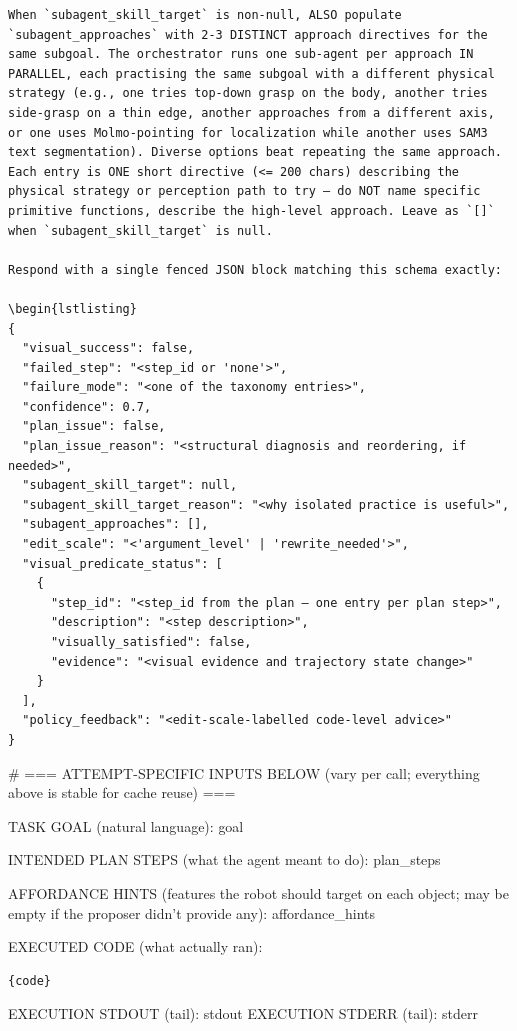 \documentclass{llmxive}
\begin{document}
\begin{lstlisting}[style=ratsappendixprompt]
When `subagent_skill_target` is non-null, ALSO populate
`subagent_approaches` with 2-3 DISTINCT approach directives for the
same subgoal. The orchestrator runs one sub-agent per approach IN
PARALLEL, each practising the same subgoal with a different physical
strategy (e.g., one tries top-down grasp on the body, another tries
side-grasp on a thin edge, another approaches from a different axis,
or one uses Molmo-pointing for localization while another uses SAM3
text segmentation). Diverse options beat repeating the same approach.
Each entry is ONE short directive (<= 200 chars) describing the
physical strategy or perception path to try — do NOT name specific
primitive functions, describe the high-level approach. Leave as `[]`
when `subagent_skill_target` is null.

Respond with a single fenced JSON block matching this schema exactly:

\begin{lstlisting}
{
  "visual_success": false,
  "failed_step": "<step_id or 'none'>",
  "failure_mode": "<one of the taxonomy entries>",
  "confidence": 0.7,
  "plan_issue": false,
  "plan_issue_reason": "<structural diagnosis and reordering, if needed>",
  "subagent_skill_target": null,
  "subagent_skill_target_reason": "<why isolated practice is useful>",
  "subagent_approaches": [],
  "edit_scale": "<'argument_level' | 'rewrite_needed'>",
  "visual_predicate_status": [
    {
      "step_id": "<step_id from the plan — one entry per plan step>",
      "description": "<step description>",
      "visually_satisfied": false,
      "evidence": "<visual evidence and trajectory state change>"
    }
  ],
  "policy_feedback": "<edit-scale-labelled code-level advice>"
}
\end{lstlisting}

# === ATTEMPT-SPECIFIC INPUTS BELOW (vary per call; everything above is
stable for cache reuse) ===

TASK GOAL (natural language): {goal}

INTENDED PLAN STEPS (what the agent meant to do):
{plan_steps}

AFFORDANCE HINTS (features the robot should target on each object; may be
empty if the proposer didn't provide any):
{affordance_hints}

EXECUTED CODE (what actually ran):
\begin{lstlisting}
{code}
\end{lstlisting}

EXECUTION STDOUT (tail): {stdout}
EXECUTION STDERR (tail): {stderr}
\end{document}
